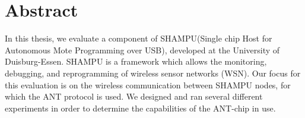 
\cleardoublepage
\section*{Abstract}
In this thesis, we evaluate a component of SHAMPU(Single chip Host for Autonomous Mote Programming over USB), developed at the University of Duisburg-Essen. 
SHAMPU is a framework which allows the monitoring, debugging, and reprogramming of wireless sensor networks (WSN). 
Our focus for this evaluation is on the wireless communication between SHAMPU nodes, for which the ANT protocol is used. 
We designed and ran several different experiments in order to determine the capabilities of the ANT-chip in use.
\cleardoublepage
